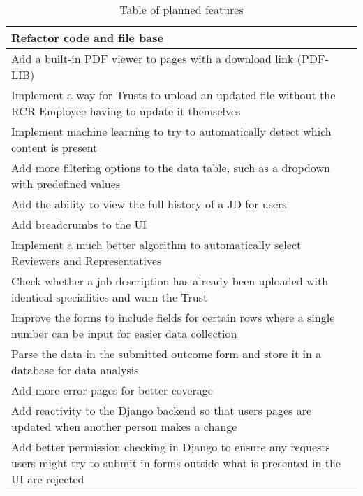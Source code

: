 \begin{table}[h!]
\begin{tabular}{||m{}||}
 Refactor code and file base\\ 
\hline
  Add a built-in PDF viewer to pages with a download link (PDF-LIB)\\ 
\hline
  Implement a way for Trusts to upload an updated file without the RCR Employee having to update it themselves\\ 
\hline
 Implement machine learning to try to automatically detect which content is present\\ 
\hline
  Add more filtering options to the data table, such as a dropdown with predefined values\\ 
\hline
  Add the ability to view the full history of a JD for users\\ 
\hline
 Add breadcrumbs to the UI\\ 
\hline
  Implement a much better algorithm to automatically select Reviewers and Representatives\\ 
\hline
  Check whether a job description has already been uploaded with identical specialities and warn the Trust\\ 
\hline
  Improve the forms to include fields for certain rows where a single number can be input for easier data collection\\ 
\hline
  Parse the data in the submitted outcome form and store it in a database for data analysis\\ 
\hline
  Add more error pages for better coverage\\ 
\hline
  Add reactivity to the Django backend so that users pages are updated when another person makes a change\\ 
\hline
  Add better permission checking in Django to ensure any requests users might try to submit in forms outside what is presented in the UI are rejected\\ [1ex]
 \hline
\end{tabular}
\vspace{-5pt}
\caption{Table of planned features}
\label{table:1}
\end{table}